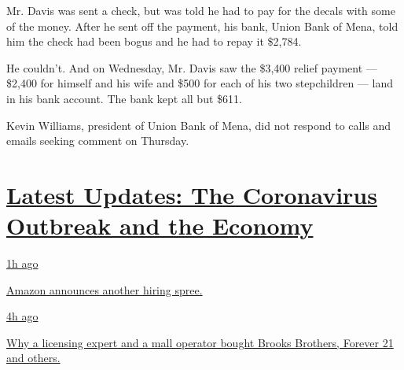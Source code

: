 Mr. Davis was sent a check, but was told he had to pay for the decals
with some of the money. After he sent off the payment, his bank, Union
Bank of Mena, told him the check had been bogus and he had to repay it
\$2,784.

He couldn't. And on Wednesday, Mr. Davis saw the \$3,400 relief payment
--- \$2,400 for himself and his wife and \$500 for each of his two
stepchildren --- land in his bank account. The bank kept all but \$611.

Kevin Williams, president of Union Bank of Mena, did not respond to
calls and emails seeking comment on Thursday.

\hypertarget{latest-updates-the-coronavirus-outbreak-and-the-economy}{%
\section{\texorpdfstring{\href{https://www.nytimes3xbfgragh.onion/live/2020/09/09/business/stock-market-today-coronavirus?action=click\&pgtype=Article\&state=default\&region=MAIN_CONTENT_1\&context=storylines_live_updates}{Latest
Updates: The Coronavirus Outbreak and the
Economy}}{Latest Updates: The Coronavirus Outbreak and the Economy}}\label{latest-updates-the-coronavirus-outbreak-and-the-economy}}

\href{https://www.nytimes3xbfgragh.onion/live/2020/09/09/business/stock-market-today-coronavirus?action=click\&pgtype=Article\&state=default\&region=MAIN_CONTENT_1\&context=storylines_live_updates\#amazon-announces-another-hiring-spree}{1h
ago}

\href{https://www.nytimes3xbfgragh.onion/live/2020/09/09/business/stock-market-today-coronavirus?action=click\&pgtype=Article\&state=default\&region=MAIN_CONTENT_1\&context=storylines_live_updates\#amazon-announces-another-hiring-spree}{Amazon
announces another hiring spree.}

\href{https://www.nytimes3xbfgragh.onion/live/2020/09/09/business/stock-market-today-coronavirus?action=click\&pgtype=Article\&state=default\&region=MAIN_CONTENT_1\&context=storylines_live_updates\#why-a-licensing-expert-and-a-mall-operator-bought-brooks-brothers-forever-21-and-others}{4h
ago}

\href{https://www.nytimes3xbfgragh.onion/live/2020/09/09/business/stock-market-today-coronavirus?action=click\&pgtype=Article\&state=default\&region=MAIN_CONTENT_1\&context=storylines_live_updates\#why-a-licensing-expert-and-a-mall-operator-bought-brooks-brothers-forever-21-and-others}{Why
a licensing expert and a mall operator bought Brooks Brothers, Forever
21 and others.}

